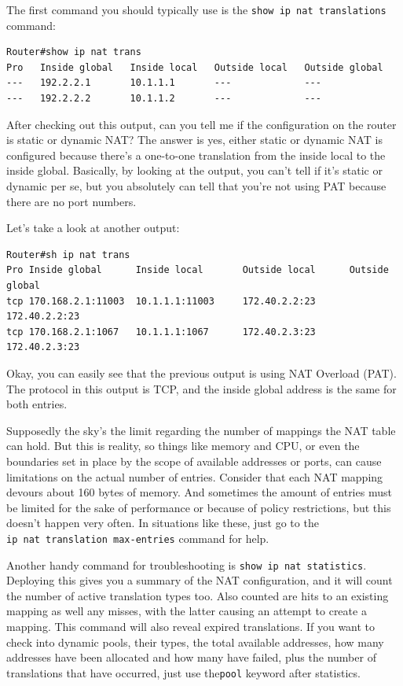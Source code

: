 \documentclass[b5paper,11pt]{memoir}
\begin{document}
The first command you should typically use is the
\texttt{show\ ip\ nat\ translations} command:

\begin{verbatim}
Router#show ip nat trans
Pro   Inside global   Inside local   Outside local   Outside global
---   192.2.2.1       10.1.1.1       ---             ---
---   192.2.2.2       10.1.1.2       ---             ---
\end{verbatim}

After checking out this output, can you tell me if the configuration on
the router is static or dynamic NAT? The answer is yes, either static or
dynamic NAT is configured because there's a one-to-one translation from
the inside local to the inside global. Basically, by looking at the
output, you can't tell if it's static or dynamic per se, but you
absolutely can tell that you're not using PAT because there are no port
numbers.

Let's take a look at another output:

\begin{verbatim}
Router#sh ip nat trans
Pro Inside global      Inside local       Outside local      Outside global
tcp 170.168.2.1:11003  10.1.1.1:11003     172.40.2.2:23      172.40.2.2:23
tcp 170.168.2.1:1067   10.1.1.1:1067      172.40.2.3:23      172.40.2.3:23
\end{verbatim}

Okay, you can easily see that the previous output is using NAT Overload
(PAT). The protocol in this output is TCP, and the inside global address
is the same for both entries.

Supposedly the sky's the limit regarding the number of mappings the NAT
table can hold. But this is reality, so things like memory and CPU, or
even the boundaries set in place by the scope of available addresses or
ports, can cause limitations on the actual number of entries. Consider
that each NAT mapping devours about 160 bytes of memory. And sometimes
the amount of entries must be limited for the sake of performance or
because of policy restrictions, but this doesn't happen very often. In
situations like these, just go to the
\texttt{ip\ nat\ translation\ max-entries} command for help.

Another handy command for troubleshooting is
\texttt{show\ ip\ nat\ statistics}. Deploying this gives you a summary
of the NAT configuration, and it will count the number of active
translation types too. Also counted are hits to an existing mapping as
well any misses, with the latter causing an attempt to create a mapping.
This command will also reveal expired translations. If you want to check
into dynamic pools, their types, the total available addresses, how many
addresses have been allocated and how many have failed, plus the number
of translations that have occurred, just use the\texttt{pool} keyword
after statistics.
\end{document}
